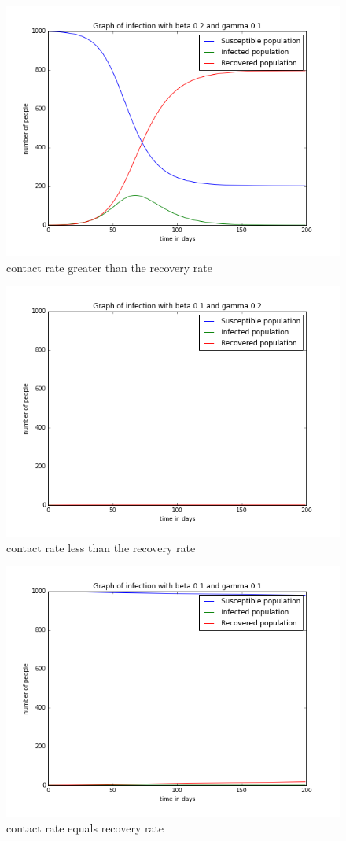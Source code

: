 \documentclass{article}
\begin{document}
\begin{figure}
  \includegraphics[width=\linewidth]{beta_greater.png}
  \caption{contact rate greater than the recovery rate}
  \label{fig:beta_greater}
\end{figure}

\begin{figure}
  \includegraphics[width=\linewidth]{beta_less.png}
  \caption{contact rate less than the recovery rate}
  \label{fig:beta_less}
\end{figure}

\begin{figure}
  \includegraphics[width=\linewidth]{beta_gamma_equal.png}
  \caption{contact rate equals recovery rate}
  \label{fig:beta_equal_gamma}
\end{figure}
\end{document}
